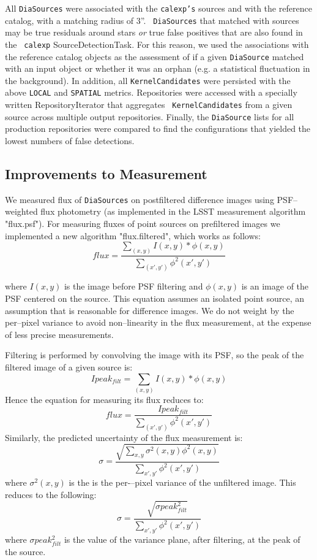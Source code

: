 \documentclass[prd, nofootinbib, floatfix, 11pt,tightenlines,times]{article}
\begin{document}
All {\tt DiaSources} were associated with the {\tt calexp's} sources
and with the reference catalog, with a matching radius of 3''.  {\tt
  DiaSources} that matched with sources may be true residuals around
stars {\it or} true false positives that are also found in the {\tt
  calexp} SourceDetectionTask.  For this reason, we used the
associations with the reference catalog objects as the assessment of
if a given {\tt DiaSource} matched with an input object or whether it
was an orphan (e.g. a statistical fluctuation in the background).  In
addition, all {\tt KernelCandidates} were persisted with the above
{\tt LOCAL} and {\tt SPATIAL} metrics.  Repositories were accessed
with a specially written RepositoryIterator that aggregates {\tt
  KernelCandidates} from a given source across multiple output
repositories.  Finally, the {\tt DiaSource} lists for all production
repositories were compared to find the configurations that yielded the
lowest numbers of false detections.

\subsection{Improvements to Measurement \label{sec-meas}}

We measured flux of {\tt DiaSources} on postfiltered difference images
using PSF--weighted flux photometry (as implemented in the LSST
measurement algorithm "flux.psf").  For measuring fluxes of point
sources on prefiltered images we implemented a new algorithm
"flux.filtered", which works as follows:
%
\[flux = \frac{\sum_{(x,y)}I(x,y) * \phi(x,y)}{\sum_{(x',y')}\phi^2(x',y')}\]
%

where $I(x,y)$ is the image before PSF filtering and $\phi(x,y)$ is an
image of the PSF centered on the source. This equation assumes an
isolated point source, an assumption that is reasonable for difference
images.  We do not weight by the per--pixel variance to avoid
non--linearity in the flux measurement, at the expense of less precise
measurements.

Filtering is performed by convolving the image with its PSF, so the
peak of the filtered image of a given source is:
%
\[Ipeak_{filt} = \sum_{(x,y)}I(x,y) * \phi(x,y)\]
%
Hence the equation for measuring its flux reduces to:
%
\[flux = \frac{Ipeak_{filt}}{\sum_{(x',y')}\phi^2(x',y')}\]
%
Similarly, the predicted uncertainty of the flux measurement is:
%
\[\sigma = \frac{\sqrt{\sum_{x,y}\sigma{^2(x,y)}\phi^2(x,y)}}{\sum_{x',y'}\phi^2(x',y')}\]
%
where $\sigma{^2(x,y)}$ is the is the per-–pixel variance of the
unfiltered image. This reduces to the following:
%
\[\sigma = \frac{\sqrt{\sigma peak{_{filt}^2}}}{\sum_{x',y'}\phi^2(x',y')}\]
%
where $\sigma peak{_{filt}^2}$ is the value of the variance plane,
after filtering, at the peak of the source.
\end{document}
